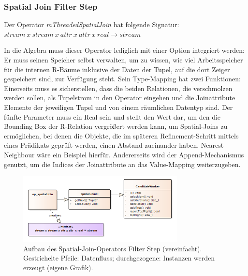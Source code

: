 \documentclass[a4paper,12pt,twoside]{article}
\newcommand{\Fb}[1]{\textit{#1}} %
\begin{document}
\subsubsection{Spatial Join Filter Step}

Der Operator \Fb{mThreadedSpatialJoin} hat folgende Signatur: \newline
$stream~x~stream~x~attr~x~attr~x~real \longrightarrow stream$

In die Algebra muss dieser Operator lediglich mit einer Option integriert werden: Er muss seinen Speicher selbst verwalten, um zu wissen, wie viel Arbeitsspeicher für die internen R-Bäume inklusive der Daten der Tupel, auf die dort Zeiger gespeichert sind, zur Verfügung steht. Sein Type-Mapping hat zwei Funktionen: Einerseits muss es sicherstellen, dass die beiden Relationen, die verschmolzen werden sollen, als Tupelstrom in den Operator eingehen und die Joinattribute Elemente der jeweiligen Tupel und von einem räumlichen Datentyp sind. Der fünfte Parameter muss ein Real sein und stellt den Wert dar, um den die Bounding Box der R-Relation vergrößert werden kann, um Spatial-Joins zu ermöglichen, bei denen die Objekte, die im späteren Refinement-Schritt mittels eines Prädikats geprüft werden, einen Abstand zueinander haben. Nearest Neighbour wäre ein Beispiel hierfür. Andererseits wird der Append-Mechanismus genutzt, um die Indices der Joinattribute an das Value-Mapping weiterzugeben.

\begin{figure}
	\centering
	\includegraphics[width=0.75\textwidth]{Bilder/spatialJoin.png}
	\caption{Aufbau des Spatial-Join-Operators Filter Step (vereinfacht). Gestrichelte Pfeile: Datenfluss; durchgezogene: Instanzen werden erzeugt (eigene Grafik).}
	\label{img:KlassSJ}
\end{figure}
\end{document}
